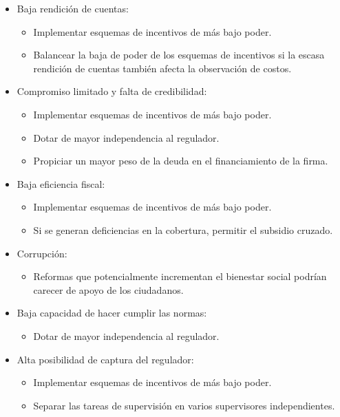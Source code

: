 \documentclass[
  12pt,
  spanish,
]{book}
\providecommand{\tightlist}{%
  \setlength{\itemsep}{0pt}\setlength{\parskip}{0pt}}
\begin{document}
\begin{itemize}
\tightlist
\item
  Baja rendición de cuentas:

  \begin{itemize}
  \tightlist
  \item
    Implementar esquemas de incentivos de más bajo poder.
  \item
    Balancear la baja de poder de los esquemas de incentivos si la escasa rendición de cuentas también afecta la observación de costos.
  \end{itemize}
\item
  Compromiso limitado y falta de credibilidad:

  \begin{itemize}
  \tightlist
  \item
    Implementar esquemas de incentivos de más bajo poder.
  \item
    Dotar de mayor independencia al regulador.
  \item
    Propiciar un mayor peso de la deuda en el financiamiento de la firma.
  \end{itemize}
\item
  Baja eficiencia fiscal:

  \begin{itemize}
  \tightlist
  \item
    Implementar esquemas de incentivos de más bajo poder.
  \item
    Si se generan deficiencias en la cobertura, permitir el subsidio cruzado.
  \end{itemize}
\item
  Corrupción:

  \begin{itemize}
  \tightlist
  \item
    Reformas que potencialmente incrementan el bienestar social podrían carecer de apoyo de los ciudadanos.
  \end{itemize}
\item
  Baja capacidad de hacer cumplir las normas:

  \begin{itemize}
  \tightlist
  \item
    Dotar de mayor independencia al regulador.
  \end{itemize}
\item
  Alta posibilidad de captura del regulador:

  \begin{itemize}
  \tightlist
  \item
    Implementar esquemas de incentivos de más bajo poder.
  \item
    Separar las tareas de supervisión en varios supervisores independientes.
  \end{itemize}
\end{itemize}
\end{document}
